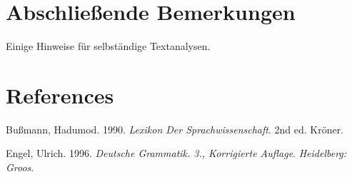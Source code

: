 \documentclass[
  letterpaper,
  DIV=11,
  numbers=noendperiod]{scrreprt}
\newlength{\cslhangindent}
\newlength{\cslentryspacingunit} %
\newenvironment{CSLReferences}[2] %
 {%
  \setlength{\parindent}{0pt}
  \ifodd #1
  \let\oldpar\par
  \def\par{\hangindent=\cslhangindent\oldpar}
  \fi
  \setlength{\parskip}{#2\cslentryspacingunit}
 }%
 {}
\begin{document}
\hypertarget{abschlieuxdfende-bemerkungen}{%
\chapter{Abschließende Bemerkungen}\label{abschlieuxdfende-bemerkungen}}

Einige Hinweise für selbständige Textanalysen.


\hypertarget{references}{%
\chapter*{References}\label{references}}

\hypertarget{refs}{}
\begin{CSLReferences}{1}{0}
\leavevmode{}%
Bußmann, Hadumod. 1990. \emph{Lexikon Der Sprachwissenschaft}. 2nd ed.
Kr{ö}ner.

\leavevmode{}%
Engel, Ulrich. 1996. \emph{Deutsche Grammatik. 3., Korrigierte Auflage}.
\emph{Heidelberg: Groos}.

\end{CSLReferences}



\printindex
\end{document}
